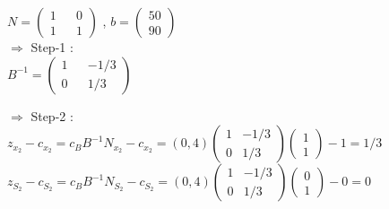 \documentclass{beamer}
\begin{document}
\begin{frame}
$N =\begin{pmatrix}
1 && 0  \\
1 && 1  
\end{pmatrix}$ ,
$b =\begin{pmatrix}
50   \\
90
\end{pmatrix}$\\
\vspace{0.5cm}
$\Rightarrow$  Step-1 :  \\
\vspace{0cm}
\hspace{2cm}
 $ B^{-1} =\begin{pmatrix}
1 && -1/3   \\
0 && 1/3  
\end{pmatrix}$

$\Rightarrow$  Step-2 :  \\
\vspace{0.4cm}
$ z_{x_2} - c_{x_2} = c_{B}B^{-1}N_{x_2} - c_{x_2}  = (0,4) \begin{pmatrix}
1 & -1/3   \\
0 & 1/3  
\end{pmatrix} \begin{pmatrix}
1   \\
1  
\end{pmatrix} - 1 = 1/3 $   \\
\vspace{0.4cm}
$ z_{S_2} - c_{S_2} = c_{B}B^{-1}N_{S_2} - c_{S_2}  = (0,4) \begin{pmatrix}
1 & -1/3   \\
0 & 1/3  
\end{pmatrix} \begin{pmatrix}
0   \\
1  
\end{pmatrix} - 0 = 0 $  \\
\vspace{0.4cm}

\end{frame}
\end{document}
